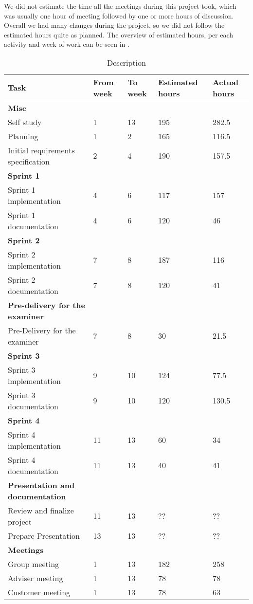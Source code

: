 \documentclass[../document]{subfiles}
\begin{document}
We did not estimate the time all the meetings during this project took, which was usually one hour of meeting followed by one or more hours of discussion. Overall we had many changes during the project, so we did not follow the estimated hours quite as planned. The overview of estimated hours, per each activity and week of work can be seen in .


\begin{table}
\caption{Description}
\centering
\label{tab:time_estimate}
\begin{tabularx}{\textwidth}{|l|X|X|L{1.6cm}|X|}
	\hline
	\textbf{Task}
	&\textbf{From week}
	&\textbf{To week}
	&\textbf{Estimated hours}
	&\textbf{Actual hours}
	\\ \hline \textbf{Misc}
	&
	&
	&
	&
	\\ \hline Self study
	&1
	&13
	&195
	&282.5
	\\ \hline Planning
	&1
	&2
	&165
	&116.5
	\\ \hline Initial requirements specification
	&2
	&4
	&190
	&157.5
	\\ \hline \textbf{Sprint 1}
	&
	&
	&
	&
	\\ \hline Sprint 1 implementation
	&4
	&6
	&117
	&157
	\\ \hline Sprint 1 documentation
	&4
	&6
	&120
	&46
	\\ \hline \textbf{Sprint 2}
	&
	&
	&
	&
	\\ \hline Sprint 2 implementation
	&7
	&8
	&187
	&116
	\\ \hline Sprint 2 documentation
	&7
	&8
	&120
	&41
	\\ \hline \textbf{Pre-delivery for the examiner}
	&
	&
	&
	&
	\\ \hline Pre-Delivery for the examiner
	&7
	&8
	&30
	&21.5
	\\ \hline \textbf{Sprint 3}
	&
	&
	&
	&
	\\ \hline Sprint 3 implementation
	&9
	&10
	&124
	&77.5
	\\ \hline Sprint 3 documentation
	&9
	&10
	&120
	&130.5
	\\ \hline \textbf{Sprint 4}
	&
	&
	&
	&
	\\ \hline Sprint 4 implementation
	&11
	&13
	&60
	&34
	\\ \hline Sprint 4 documentation
	&11
	&13
	&40
	&41
	\\ \hline \textbf{Presentation and documentation}
	&
	&
	&
	&
	\\ \hline Review and finalize project
	&11
	&13
	&??
	&??
	\\ \hline Prepare Presentation
	&13
	&13
	&??
	&??
	\\ \hline \textbf{Meetings}
	&
	&
	&
	&
	\\ \hline Group meeting
	&1
	&13
	&182
	&258
	\\ \hline Adviser meeting
	&1
	&13
	&78
	&78
	\\ \hline Customer meeting
	&1
	&13
	&78
	&63
	\\ \hline 
\end{tabularx}
\end{table}
\end{document}

